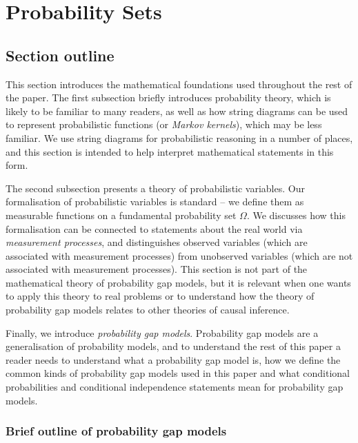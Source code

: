 

\section{Probability Sets}\label{sec:vague_variables}

\subsection{Section outline}

This section introduces the mathematical foundations used throughout the rest of the paper. The first subsection briefly introduces probability theory, which is likely to be familiar to many readers, as well as how string diagrams can be used to represent probabilistic functions (or \emph{Markov kernels}), which may be less familiar. We use string diagrams for probabilistic reasoning in a number of places, and this section is intended to help interpret mathematical statements in this form.

The second subsection presents a theory of probabilistic variables. Our formalisation of probabilistic variables is standard -- we define them as measurable functions on a fundamental probability set $\Omega$. We discusses how this formalisation can be connected to statements about the real world via \emph{measurement processes}, and distinguishes observed variables (which are associated with measurement processes) from unobserved variables (which are not associated with measurement processes). This section is not part of the mathematical theory of probability gap models, but it is relevant when one wants to apply this theory to real problems or to understand how the theory of probability gap models relates to other theories of causal inference.

Finally, we introduce \emph{probability gap models}. Probability gap models are a generalisation of probability models, and to understand the rest of this paper a reader needs to understand what a probability gap model is, how we define the common kinds of probability gap models used in this paper and what conditional probabilities and conditional independence statements mean for probability gap models.

\subsubsection{Brief outline of probability gap models}

